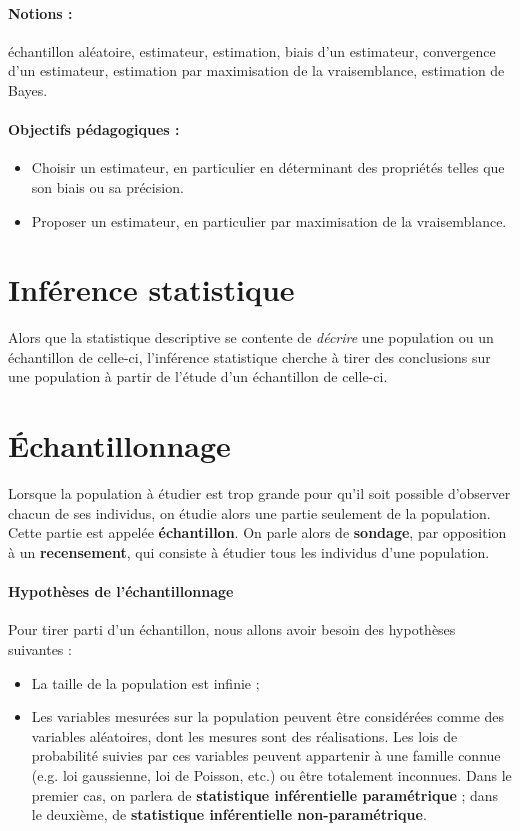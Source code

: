 \label{chap:estimation}

\paragraph{Notions :} échantillon aléatoire, estimateur, estimation, biais d'un
estimateur, convergence d'un estimateur, estimation par maximisation de la
vraisemblance, estimation de Bayes.
\paragraph{Objectifs pédagogiques :}
\begin{itemize}
\setlength{\itemsep}{3pt}
\item Choisir un estimateur, en particulier en déterminant des propriétés
  telles que son biais ou sa précision.
\item Proposer un estimateur, en particulier par maximisation de la
  vraisemblance.
\end{itemize}


\section{Inférence statistique}
Alors que la statistique descriptive se contente de \textit{décrire} une
population ou un échantillon de celle-ci, l'inférence statistique cherche à
tirer des conclusions sur une population à partir de l'étude d'un échantillon
de celle-ci. 

\section{Échantillonnage}
\label{ref:echantilonnage}

Lorsque la population à étudier est trop grande pour qu'il soit possible
d'observer chacun de ses individus, on étudie alors une partie seulement de la
population. Cette partie est appelée \textbf{échantillon}. On parle alors de
\textbf{sondage}, par opposition à un \textbf{recensement}, qui consiste à
étudier tous les individus d'une population.

\paragraph{Hypothèses de l'échantillonnage} Pour tirer parti d'un échantillon,
nous allons avoir besoin des hypothèses suivantes :
\begin{itemize}
\item La taille de la population est infinie ;
\item Les variables mesurées sur la population peuvent être considérées comme
  des variables aléatoires, dont les mesures sont des réalisations. Les lois de
  probabilité suivies par ces variables peuvent appartenir à une famille connue
  (e.g. loi gaussienne, loi de Poisson, etc.) ou être totalement
  inconnues. Dans le premier cas, on parlera de \textbf{statistique
    inférentielle paramétrique} ; dans le deuxième, de \textbf{statistique
    inférentielle non-paramétrique}.
\end{itemize}

